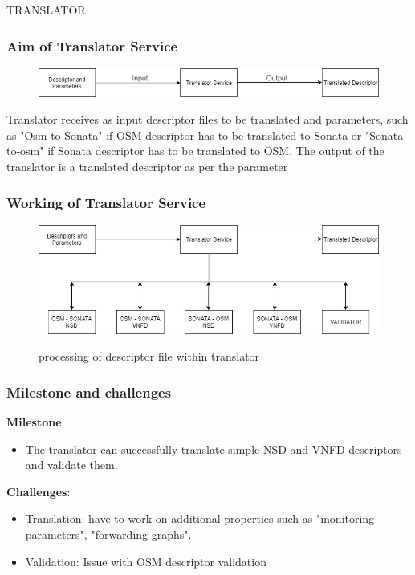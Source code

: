 \begin{frame}

\Huge{\centerline{TRANSLATOR}}
\end{frame}

\begin{frame}
\frametitle{Aim of Translator Service}
\begin{figure}
\centering
\includegraphics[width=1\linewidth]{images/img-1-translate}
\label{Figure1}
\end{figure}
Translator receives as input descriptor files to be translated and parameters, such as "Osm-to-Sonata" if OSM descriptor has to be translated to Sonata or "Sonata-to-osm" if Sonata descriptor has to be translated to OSM. The output of the translator is a translated descriptor as per the parameter 
\end{frame}

\begin{frame}
\frametitle{Working of Translator Service}
\begin{figure}
\centering
\includegraphics[width=1\linewidth]{images/img-2-translate}
\label{Figure2}
\caption{processing of descriptor file within translator}
\end{figure}
\end{frame}

\begin{frame}
\frametitle{Milestone and challenges}
\textbf{Milestone}:\\
\begin{itemize}
\item The translator can successfully translate simple NSD and VNFD descriptors and validate them.
\end{itemize}

\textbf{Challenges}:\\
\begin{itemize}
\item Translation: have  to work on additional properties such as "monitoring parameters", "forwarding graphs".
\item Validation: Issue with OSM descriptor validation
\end{itemize}

\end{frame}